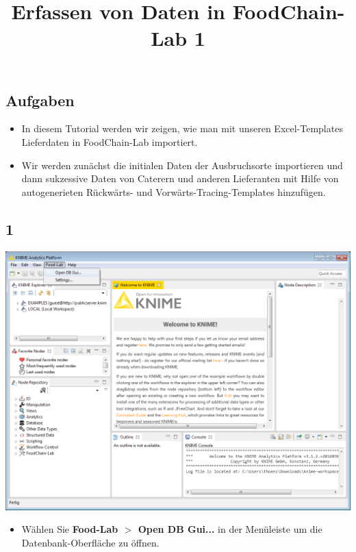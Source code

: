 \documentclass{beamer}
\title{Erfassen von Daten in FoodChain-Lab 1}
\date{}
\begin{document}
\maketitle

\section{ }

\subsection{Aufgaben}
\begin{frame}
	\begin{itemize}
		\item In diesem Tutorial werden wir zeigen, wie man mit unseren Excel-Templates Lieferdaten in FoodChain-Lab importiert.
		\item Wir werden zunächst die initialen Daten der Ausbruchsorte importieren und dann sukzessive Daten von Caterern und anderen Lieferanten mit Hilfe von autogenerieten Rückwärts- und Vorwärts-Tracing-Templates hinzufügen.
	\end{itemize}
\end{frame}
 
\subsection{1}
\begin{frame}
	\begin{center}
  		\includegraphics[height=0.6\textheight]{1.png}
	\end{center}
	\begin{itemize}
		\item Wählen Sie \textbf{Food-Lab $>$ Open DB Gui...} in der Menüleiste um die Datenbank-Oberfläche zu öffnen.
	\end{itemize}
\end{frame}
\end{document}
